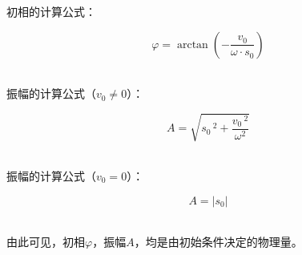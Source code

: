 \documentclass[UTF8]{ctexart}
\begin{document}
\newpage

    初相的计算公式：
    \begin{large}
        \begin{equation*}
            \varphi=\arctan{\left(-\frac{v_0}{\omega\cdot s_0}\right)}
        \end{equation*}
    \end{large}\\
    振幅的计算公式（$v_0\neq 0$）：
    \begin{large}
        \begin{equation*}
            A=\sqrt{s_0\,^2+\frac{v_0\,^2}{\omega^2}}
        \end{equation*}
    \end{large}\\
    振幅的计算公式（$v_0=0$）：
    \begin{large}
        \begin{equation*}
            A=|s_0|
        \end{equation*}
    \end{large}\\
    由此可见，初相$\varphi$，振幅$A$，均是由初始条件决定的物理量。\\[3mm]

\newpage
\end{document}
